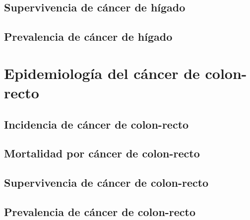\subsection{Supervivencia de cáncer de hígado} 

\subsection{Prevalencia de cáncer de hígado}


\section{Epidemiología del cáncer de colon-recto}

\subsection{Incidencia de cáncer de colon-recto}

\subsection{Mortalidad por cáncer de colon-recto}

\subsection{Supervivencia de cáncer de colon-recto} 

\subsection{Prevalencia de cáncer de colon-recto}






